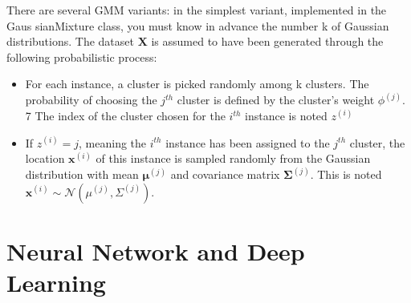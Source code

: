 \documentclass[french]{article}
\begin{document}
There are several GMM variants: in the simplest variant, implemented in the Gaus sianMixture class, you must know in advance the number k of Gaussian distributions. The dataset $\bm{X}$ is assumed to have been generated through the following probabilistic process:

\begin{itemize}
    \item For each instance, a cluster is picked randomly among k clusters. The probability of choosing the $j^{th}$ cluster is defined by the cluster’s weight $\phi^{(j)}$. 7 The index of the cluster chosen for the $i^{th}$ instance is noted $z^{(i)}$
    \item If $z^{(i)} = j$, meaning the $i^{th}$ instance has been assigned to the $j^{th}$ cluster, the location
$\bm{x}^{(i)}$ of this instance is sampled randomly from the Gaussian distribution with
mean $\bm{\mu}^{(j)}$ and covariance matrix $\bm{\Sigma}^{(j)}$. This is noted $\bm{x}^{(i)} \sim \mathscr{N}(\mu^{(j)}, \Sigma^{(j)})$.
\end{itemize}

\section{Neural Network and Deep Learning}
\end{document}
